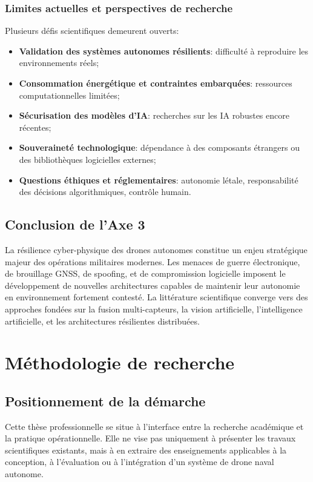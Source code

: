 \documentclass[12pt, a4paper, twoside, openright]{report}
\begin{document}
\subsection{Limites actuelles et perspectives de recherche}
Plusieurs défis scientifiques demeurent ouverts:
\begin{itemize}
    \item \textbf{Validation des systèmes autonomes résilients}: difficulté à reproduire les environnements réels;
    \item \textbf{Consommation énergétique et contraintes embarquées}: ressources computationnelles limitées;
    \item \textbf{Sécurisation des modèles d’IA}: recherches sur les IA robustes encore récentes;
    \item \textbf{Souveraineté technologique}: dépendance à des composants étrangers ou des bibliothèques logicielles externes;
    \item \textbf{Questions éthiques et réglementaires}: autonomie létale, responsabilité des décisions algorithmiques, contrôle humain.
\end{itemize}

\section{Conclusion de l'Axe 3}
La résilience cyber-physique des drones autonomes constitue un enjeu stratégique majeur des opérations militaires modernes. Les menaces de guerre électronique, de brouillage GNSS, de spoofing, et de compromission logicielle imposent le développement de nouvelles architectures capables de maintenir leur autonomie en environnement fortement contesté. La littérature scientifique converge vers des approches fondées sur la fusion multi-capteurs, la vision artificielle, l’intelligence artificielle, et les architectures résilientes distribuées.

\cleardoublepage

\chapter{Méthodologie de recherche}\label{chap:methodologie}

\section{Positionnement de la démarche}
Cette thèse professionnelle se situe à l’interface entre la recherche académique et la pratique opérationnelle. Elle ne vise pas uniquement à présenter les travaux scientifiques existants, mais à en extraire des enseignements applicables à la conception, à l’évaluation ou à l’intégration d’un système de drone naval autonome.
\end{document}
